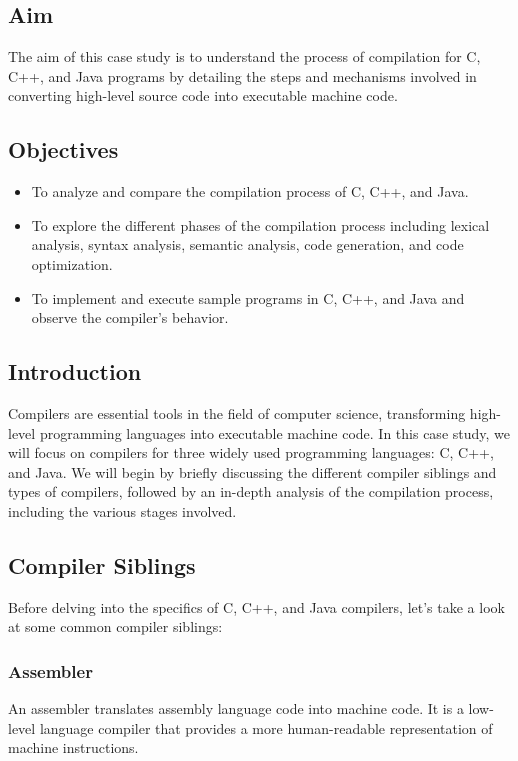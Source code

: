 \documentclass[12pt]{article}
\begin{document}
\subsection*{Aim}
The aim of this case study is to understand the process of compilation for C, C++, and Java programs by detailing the steps and mechanisms involved in converting high-level source code into executable machine code.

\subsection*{Objectives}
\begin{itemize}
    \item To analyze and compare the compilation process of C, C++, and Java.
    \item To explore the different phases of the compilation process including lexical analysis, syntax analysis, semantic analysis, code generation, and code optimization.
    \item To implement and execute sample programs in C, C++, and Java and observe the compiler's behavior.
\end{itemize}

\subsection*{Introduction}
Compilers are essential tools in the field of computer science, transforming high-level programming languages into executable machine code. In this case study, we will focus on compilers for three widely used programming languages: C, C++, and Java. We will begin by briefly discussing the different compiler siblings and types of compilers, followed by an in-depth analysis of the compilation process, including the various stages involved.

\subsection*{Compiler Siblings}
Before delving into the specifics of C, C++, and Java compilers, let's take a look at some common compiler siblings:

\subsubsection*{Assembler}
An assembler translates assembly language code into machine code. It is a low-level language compiler that provides a more human-readable representation of machine instructions.
\end{document}
